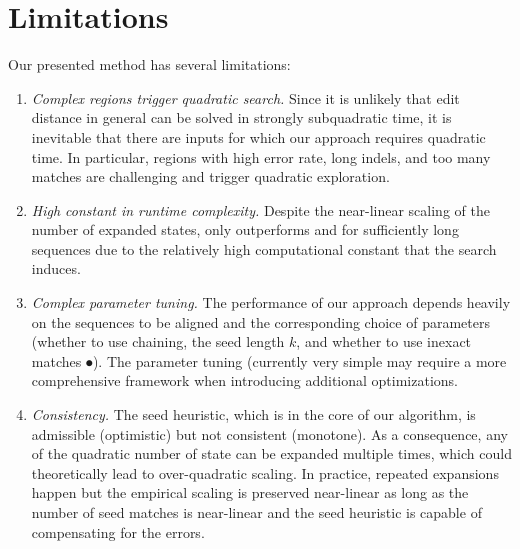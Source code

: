 \section*{Limitations}

Our presented method has several limitations:
\begin{enumerate}
  \item \emph{Complex regions trigger quadratic search.} Since it is unlikely
        that edit distance in general can be solved in strongly subquadratic
        time, it is inevitable that there are inputs for which our approach
        requires quadratic time.  In particular, regions with high error rate,
        long indels, and too many matches are challenging and trigger quadratic
        exploration.
  \item \emph{High constant in runtime complexity.} Despite the near-linear
        scaling of the number of expanded states, \astarpa only outperforms
        \edlib and \wfa for sufficiently long sequences due to the relatively
        high computational constant that the \A search induces.
  \item \emph{Complex parameter tuning.} The performance of our approach depends
        heavily on the sequences to be aligned and the corresponding choice of
        parameters (whether to use chaining, the seed length $k$, and whether to
        use inexact matches $\spot$). The parameter tuning (currently very
        simple may require a more comprehensive framework when introducing
        additional optimizations.
  \item \emph{Consistency.} The seed heuristic, which is in the core of our \A
        algorithm, is admissible (optimistic) but not consistent (monotone). As
        a consequence, any of the quadratic number of state can be expanded
        multiple times, which could theoretically lead to over-quadratic
        scaling. In practice, repeated expansions happen but the empirical
        scaling is preserved near-linear as long as the number of seed matches
        is near-linear and the seed heuristic is capable of compensating for the
        errors.
\end{enumerate}

